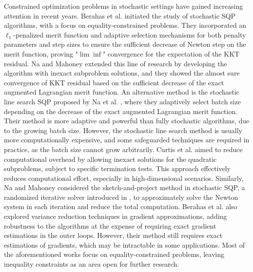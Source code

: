 \documentclass[aos]{imsart}
\numberwithin{equation}{section}
\theoremstyle{plain}
\begin{document}
Constrained optimization problems in stochastic settings have gained increasing attention in recent years.  
Berahas et al. \cite{berahas2021sequential} initiated the study of stochastic SQP algorithms, with a focus on equality-constrained problems.
They incorporated an $\ell_1$-penalized merit function and adaptive selection mechanisms for both penalty parameters and step sizes to ensure the sufficient decrease of Newton step on the merit function, proving "$\lim \inf$" convergence for the expectation of the KKT residual.
Na and Mahoney \cite{na2022asymptotic} extended this line of research by developing the algorithm with inexact subproblem solutions, and they showed the almost sure convergence of KKT residual based on the sufficient decrease of the exact augmented Lagrangian merit function. 
An alternative method is the stochastic line search SQP proposed by Na et al. \cite{na2023adaptive}, where they adaptively select batch size depending on the decrease of the exact augmented Lagrangian merit function. 
Their method is more adaptive and powerful than fully stochastic algorithms, due to the growing batch size. 
However, the stochastic line search method is usually more computationally expensive, and some safeguarded techniques are required in practice, as the batch size cannot grow arbitrarily. 
Curtis et al. \cite{curtis2021inexact} aimed to reduce computational overhead by allowing inexact solutions for the quadratic subproblems, subject to specific termination tests. This approach effectively reduces computational effort, especially in high-dimensional scenarios.
Similarly, Na and Mahoney \cite{na2022asymptotic} considered the sketch-and-project method in stochastic SQP, a randomized iterative solver introduced in \cite{gower2015randomized}, to approximately solve the Newton system in each iteration and reduce the total computation. 
Berahas et al. \cite{berahas2023accelerating} also explored variance reduction techniques in gradient approximations, adding robustness to the algorithms at the expense of requiring exact gradient estimations in the outer loops. 
However, their method still requires exact estimations of gradients, which may be intractable in some applications. 
Most of the aforementioned works focus on equality-constrained problems, leaving inequality constraints as an area open for further research.
\end{document}
